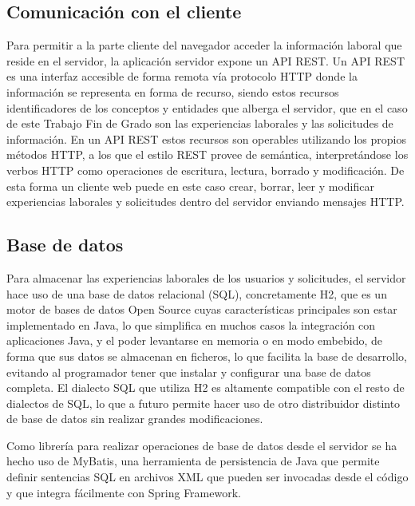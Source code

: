 \documentclass[a4paper, 12pt]{book}
\begin{document}
\subsection{Comunicación con el cliente}
\label{subsec:intro_applicationserver_communicationwithclient}

Para permitir a la parte cliente del navegador acceder la información laboral que reside en el servidor, la aplicación servidor expone un API REST. 
Un API REST es una interfaz accesible de forma remota vía protocolo HTTP donde la información se representa en forma de recurso, siendo estos recursos identificadores de los conceptos y entidades que alberga el servidor, que en el caso de este Trabajo Fin de Grado son las experiencias laborales y las solicitudes de información. 
En un API REST estos recursos son operables utilizando los propios métodos HTTP, a los que el estilo REST provee de semántica, interpretándose los verbos HTTP como operaciones de escritura, lectura, borrado y modificación. De esta forma un cliente web puede en este caso crear, borrar, leer y modificar experiencias laborales y solicitudes dentro del servidor enviando mensajes HTTP.

\subsection{Base de datos}
\label{subsec:intro_applicationserver_database}

Para almacenar las experiencias laborales de los usuarios y solicitudes, el servidor hace uso de una base de datos relacional (SQL), concretamente H2, que es un motor de bases de datos Open Source cuyas características principales son estar implementado en Java, 
lo que simplifica en muchos casos la integración con aplicaciones Java, y el poder levantarse en memoria o en modo embebido, de forma que sus datos se almacenan en ficheros, lo que facilita la base de desarrollo, evitando al programador tener que instalar y configurar una base de datos completa. 
El dialecto SQL que utiliza H2 es altamente compatible con el resto de dialectos de SQL, lo que a futuro permite hacer uso de otro distribuidor distinto de base de datos sin realizar grandes modificaciones.

Como librería para realizar operaciones de base de datos desde el servidor se ha hecho uso de MyBatis, una herramienta de persistencia de Java que permite definir sentencias SQL en archivos XML que pueden ser invocadas desde el código y que integra fácilmente con Spring Framework.
\end{document}
